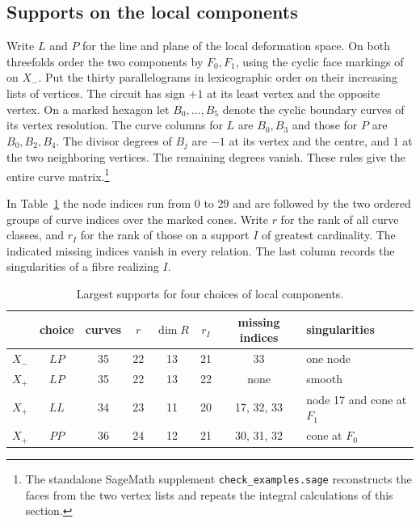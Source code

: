 \subsection{Supports on the local components}
Write $L$ and $P$ for the line and plane of the local deformation
space. On both threefolds order the two components by $F_0,F_1$, using
the cyclic face markings of \cite[\S5]{W5} on $X_-$. Put the thirty
parallelograms in lexicographic order on their increasing lists of
vertices. The circuit has sign $+1$ at its least vertex and the
opposite vertex. On a marked hexagon let $B_0,\dots,B_5$ denote
the cyclic boundary curves of its vertex resolution. The curve
columns for $L$ are $B_0,B_3$ and those for $P$ are $B_0,B_2,B_4$.
The divisor degrees of $B_j$ are $-1$ at its vertex and the
centre, and $1$ at the two neighboring vertices. The remaining
degrees vanish. These rules give the entire curve matrix.\footnote{The
standalone SageMath supplement \texttt{check\_examples.sage}
reconstructs the faces from the two vertex lists and repeats the
integral calculations of this section.}

In Table~\ref{tab:maximal-support} the node indices run from $0$ to
$29$ and are followed by the two ordered groups of curve indices
over the marked cones. Write $r$ for the rank of all curve classes,
and $r_I$ for the rank of those on a support $I$ of greatest
cardinality. The indicated missing indices vanish in every relation.
The last column records the singularities of a fibre realizing $I$.
\begin{table}[ht]
\centering
\caption{Largest supports for four choices of local components.}
\label{tab:maximal-support}
\begin{tabular}{cccccccl}
\hline
& choice & curves & $r$ & $\dim R$ & $r_I$ & missing indices & singularities\\
\hline
$X_-$&$LP$&35&22&13&21&33&one node\\
$X_+$&$LP$&35&22&13&22&none&smooth\\
$X_+$&$LL$&34&23&11&20&17, 32, 33&node 17 and cone at $F_1$\\
$X_+$&$PP$&36&24&12&21&30, 31, 32&cone at $F_0$\\
\hline
\end{tabular}
\end{table}

